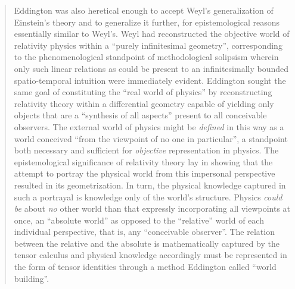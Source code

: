 \begin{quote}
    Eddington was also heretical enough to accept Weyl's generalization of Einstein's theory and to generalize it further, for epistemological reasons essentially similar to Weyl's.  Weyl had reconstructed the objective world of relativity physics within a ``purely infinitesimal geometry'', corresponding to the phenomenological standpoint of methodological solipsism wherein only such linear relations as could be present to an infinitesimally bounded spatio-temporal intuition were immediately evident.  Eddington sought the same goal of constituting the ``real world of physics'' by reconstructing relativity theory within a differential geometry capable of yielding only objects that are a ``synthesis of all aspects'' present to all conceivable observers.  The external world of physics might be \emph{defined} in this way as a world conceived ``from the viewpoint of no one in particular'', a standpoint both necessary and sufficient for \emph{objective} representation in physics.  The epistemological significance of relativity theory lay in showing that the attempt to portray the physical world from this impersonal perspective resulted in its geometrization.  In turn, the physical knowledge captured in such a portrayal is knowledge only of the world's structure.  Physics \emph{could be} about \emph{no} other world than that expressly incorporating all viewpoints at once, an ``absolute world'' as opposed to the ``relative'' world of each individual perspective, that is, any ``conceivable observer''.  The relation between the relative and the absolute is mathematically captured by the tensor calculus and physical knowledge accordingly must be represented in the form of tensor identities through a method Eddington called ``world building''.
    

\end{quote}
